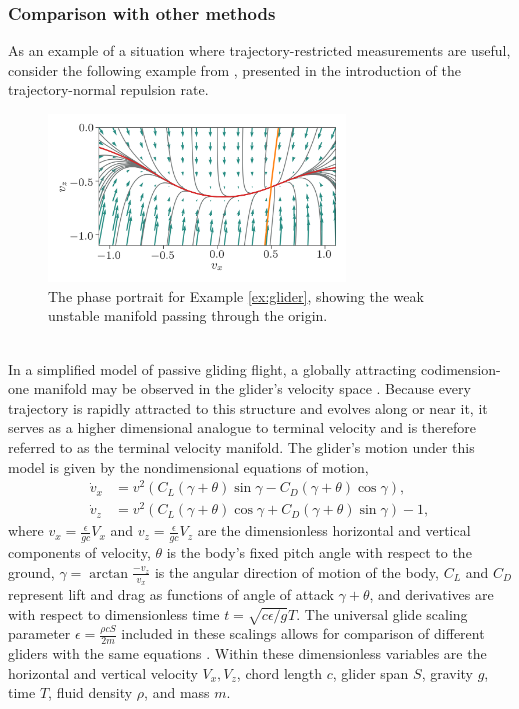 \documentclass[twocolumn]{svjour3}
\begin{document}
\subsubsection{Comparison with other methods}
As an example of a situation where trajectory-restricted measurements are useful, consider the following example from \cite{haller_variational_2011}, presented in the introduction of the trajectory-normal repulsion rate.

\begin{figure}
\centering
\includegraphics[width=3.1in]{Figures/PhasePlot_glider-example}
\caption{The phase portrait for Example \ref{ex:glider}, showing the weak unstable manifold passing through the origin.}
\label{fig:glider}
\end{figure}

 \\
In a simplified model of passive gliding flight, a globally attracting codimension-one manifold may be observed in the glider's velocity space \cite{yeaton_global_2017,nave2018global}. Because every trajectory is rapidly attracted to this structure and evolves along or near it, it serves as a higher dimensional analogue to terminal velocity and is therefore referred to as the terminal velocity manifold. The glider's motion under this model is given by the nondimensional equations of motion,
\begin{equation}
\begin{aligned}
\dot{v}_x &= v^2\left(C_L\left(\gamma+\theta\right)\sin\gamma - C_D\left(\gamma+\theta\right)\cos\gamma\right), \\
\dot{v}_z &= v^2\left(C_L\left(\gamma+\theta\right)\cos\gamma + C_D\left(\gamma+\theta\right)\sin\gamma\right) - 1,
\end{aligned}
\end{equation}
where $v_x=\tfrac{\epsilon}{gc}V_x$ and $v_z=\tfrac{\epsilon}{gc}V_z$ are the dimensionless horizontal and vertical components of velocity, $\theta$ is the body's fixed pitch angle with respect to the ground, $\gamma=\arctan\tfrac{-v_z}{v_x}$ is the angular direction of motion of the body, $C_L$ and $C_D$ represent lift and drag as functions of angle of attack $\gamma+\theta$, and derivatives are with respect to dimensionless time $t=\sqrt{c\epsilon/g}T$. The universal glide scaling parameter $\epsilon=\tfrac{\rho c S}{2m}$ included in these scalings allows for comparison of different gliders with the same equations \cite{yeaton_global_2017}. Within these dimensionless variables are the horizontal and vertical velocity $V_x,V_z$, chord length $c$, glider span $S$, gravity $g$, time $T$, fluid density $\rho$, and mass $m$.
\end{document}
